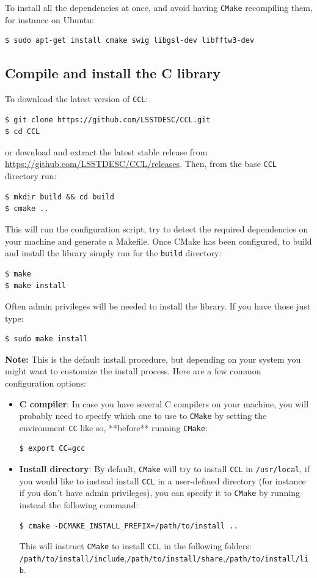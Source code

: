 \documentclass[\docopts]{\docclass}
\newcommand{\ccl}{{\tt CCL}\xspace}
\begin{document}
To install all the dependencies at once, and avoid having {\tt CMake} recompiling them, for instance on Ubuntu:
\begin{verbatim}
$ sudo apt-get install cmake swig libgsl-dev libfftw3-dev
\end{verbatim}

\subsection{Compile and install the C library}

To download the latest version of \ccl:
\begin{verbatim}
$ git clone https://github.com/LSSTDESC/CCL.git
$ cd CCL
\end{verbatim}
or download and extract the latest stable release from \url{https://github.com/LSSTDESC/CCL/releases}. Then, from the base \ccl directory run:
\begin{verbatim}
$ mkdir build && cd build
$ cmake ..
\end{verbatim}
This will run the configuration script, try to detect the required dependencies
on your machine and generate a Makefile. Once CMake has been configured, to build
and install the library simply run for the {\tt build} directory:
\begin{verbatim}
$ make
$ make install
\end{verbatim}
Often admin privileges will be needed to install the library. If you have those just type:
\begin{verbatim}
$ sudo make install
\end{verbatim}

{\bf Note:} This is the default install procedure, but depending on your system
you might want to customize the install process. Here are a few common configuration
options:
\begin{itemize}
  \item {\bf C compiler}: In case you have several C compilers on your machine, you will probably
need to specify which one to use to {\tt CMake} by setting the environment {\tt CC} like
so, **before** running {\tt CMake}:
\begin{verbatim}
$ export CC=gcc
\end{verbatim}
  \item {\bf Install directory}: By default, {\tt CMake} will try to install \ccl in {\tt /usr/local}, if you would like to instead install \ccl in a user-defined directory (for instance if you don't have
 admin privileges), you can specify it to {\tt CMake} by running instead the following command:
\begin{verbatim}
$ cmake -DCMAKE_INSTALL_PREFIX=/path/to/install ..
\end{verbatim}
This will instruct {\tt CMake} to install \ccl in the following folders: {\tt /path/to/install/include},{\tt /path/to/install/share},{\tt /path/to/install/lib}.
\end{itemize}
\end{document}
